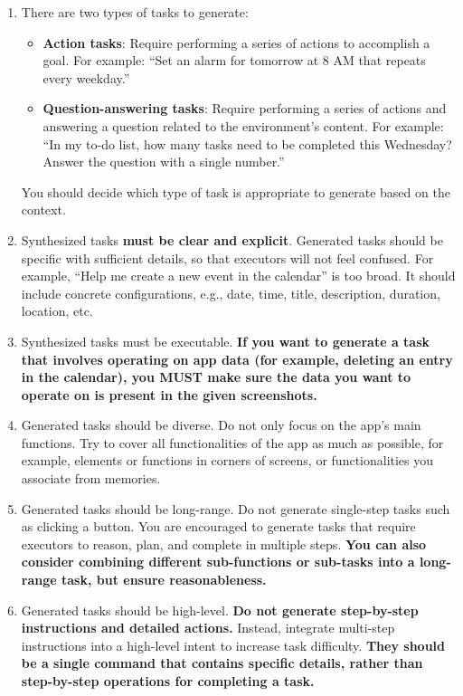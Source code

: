 \documentclass{article} %
\begin{document}
\begin{tcolorbox}[title=Prompt for Task Instruction Synthesis, colback=gray!5, colframe=gray!50, fonttitle=\bfseries\small, fontupper=\small, fontlower=\small, breakable]
\begin{enumerate}[leftmargin=1.5em]
    \item There are two types of tasks to generate:
    \begin{itemize}[nosep]
        \item \textbf{Action tasks}: Require performing a series of actions to accomplish a goal. For example: ``Set an alarm for tomorrow at 8 AM that repeats every weekday.''
        \item \textbf{Question-answering tasks}: Require performing a series of actions and answering a question related to the environment's content. For example: ``In my to-do list, how many tasks need to be completed this Wednesday? Answer the question with a single number.''
    \end{itemize}
    You should decide which type of task is appropriate to generate based on the context.

    \item Synthesized tasks \textbf{must be clear and explicit}. Generated tasks should be specific with sufficient details, so that executors will not feel confused. For example, ``Help me create a new event in the calendar'' is too broad. It should include concrete configurations, e.g., date, time, title, description, duration, location, etc.

    \item Synthesized tasks must be executable. \textbf{If you want to generate a task that involves operating on app data (for example, deleting an entry in the calendar), you MUST make sure the data you want to operate on is present in the given screenshots.}

    \item Generated tasks should be diverse. Do not only focus on the app's main functions. Try to cover all functionalities of the app as much as possible, for example, elements or functions in corners of screens, or functionalities you associate from memories.

    \item Generated tasks should be long-range. Do not generate single-step tasks such as clicking a button. You are encouraged to generate tasks that require executors to reason, plan, and complete in multiple steps. \textbf{You can also consider combining different sub-functions or sub-tasks into a long-range task, but ensure reasonableness.}

    \item Generated tasks should be high-level. \textbf{Do not generate step-by-step instructions and detailed actions.} Instead, integrate multi-step instructions into a high-level intent to increase task difficulty. \textbf{They should be a single command that contains specific details, rather than step-by-step operations for completing a task.}


\end{enumerate}
\end{tcolorbox}
\end{document}
